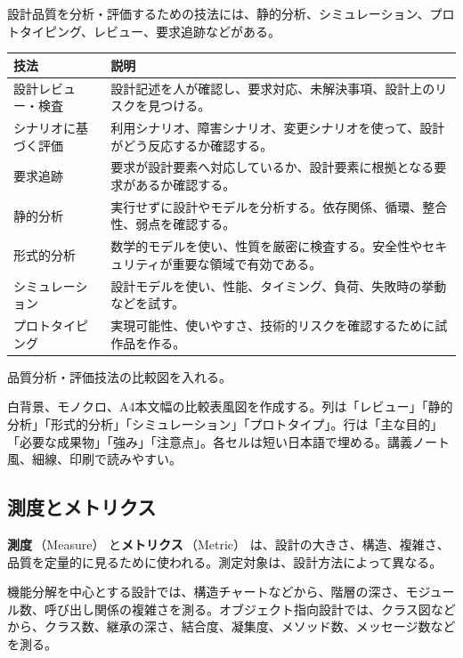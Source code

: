 \documentclass[10.5pt,a4paper]{ltjsarticle}
\newcommand{\term}[2]{\textbf{#1}\,（#2）}
\begin{document}
設計品質を分析・評価するための技法には、静的分析、シミュレーション、プロトタイピング、レビュー、要求追跡などがある。

\begin{tabularx}{\linewidth}{L{36mm}Y}
\toprule
\textbf{技法} & \textbf{説明} \\
\midrule
設計レビュー・検査 & 設計記述を人が確認し、要求対応、未解決事項、設計上のリスクを見つける。 \\
シナリオに基づく評価 & 利用シナリオ、障害シナリオ、変更シナリオを使って、設計がどう反応するか確認する。 \\
要求追跡 & 要求が設計要素へ対応しているか、設計要素に根拠となる要求があるか確認する。 \\
静的分析 & 実行せずに設計やモデルを分析する。依存関係、循環、整合性、弱点を確認する。 \\
形式的分析 & 数学的モデルを使い、性質を厳密に検査する。安全性やセキュリティが重要な領域で有効である。 \\
シミュレーション & 設計モデルを使い、性能、タイミング、負荷、失敗時の挙動などを試す。 \\
プロトタイピング & 実現可能性、使いやすさ、技術的リスクを確認するために試作品を作る。 \\
\bottomrule
\end{tabularx}

\begin{todobox}
品質分析・評価技法の比較図を入れる。
\end{todobox}
\begin{promptbox}
白背景、モノクロ、A4本文幅の比較表風図を作成する。列は「レビュー」「静的分析」「形式的分析」「シミュレーション」「プロトタイプ」。行は「主な目的」「必要な成果物」「強み」「注意点」。各セルは短い日本語で埋める。講義ノート風、細線、印刷で読みやすい。
\end{promptbox}

\subsection{測度とメトリクス}

\term{測度}{Measure} と\term{メトリクス}{Metric} は、設計の大きさ、構造、複雑さ、品質を定量的に見るために使われる。測定対象は、設計方法によって異なる。

機能分解を中心とする設計では、構造チャートなどから、階層の深さ、モジュール数、呼び出し関係の複雑さを測る。オブジェクト指向設計では、クラス図などから、クラス数、継承の深さ、結合度、凝集度、メソッド数、メッセージ数などを測る。
\end{document}
